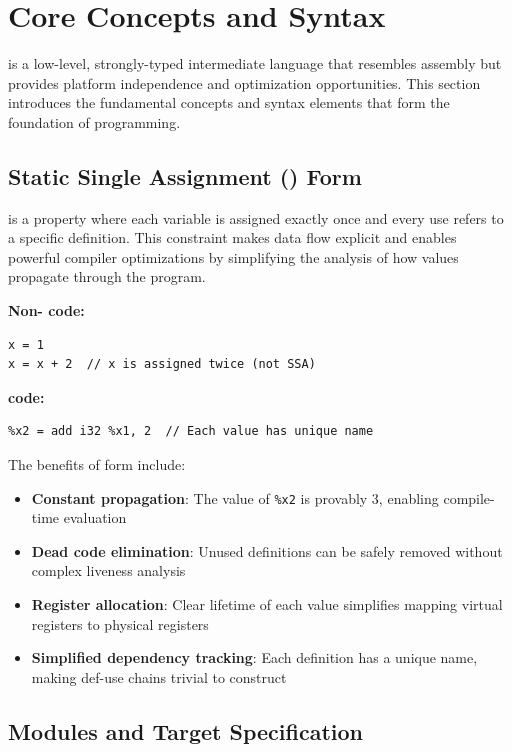 \section{Core Concepts and  Syntax}

  is a low-level, strongly-typed intermediate language that resembles assembly but provides platform independence and optimization opportunities. This section introduces the fundamental concepts and syntax elements that form the foundation of   programming.

\subsection{Static Single Assignment () Form}

 is a property where each variable is assigned exactly once and every use refers to a specific definition. This constraint makes data flow explicit and enables powerful compiler optimizations by simplifying the analysis of how values propagate through the program.

\textbf{Non- code:}
\begin{lstlisting}[style=ir]
x = 1
x = x + 2  // x is assigned twice (not SSA)
\end{lstlisting}

\textbf{ code:}
\begin{lstlisting}[style=ir]
%x1 = 1
%x2 = add i32 %x1, 2  // Each value has unique name
\end{lstlisting}

The benefits of  form include:
\begin{itemize}[noitemsep]
  \item \textbf{Constant propagation}: The value of \texttt{\%x2} is provably 3, enabling compile-time evaluation
  \item \textbf{Dead code elimination}: Unused definitions can be safely removed without complex liveness analysis
  \item \textbf{Register allocation}: Clear lifetime of each value simplifies mapping virtual registers to physical registers
  \item \textbf{Simplified dependency tracking}: Each definition has a unique name, making def-use chains trivial to construct
\end{itemize}

\subsection{Modules and Target Specification}

